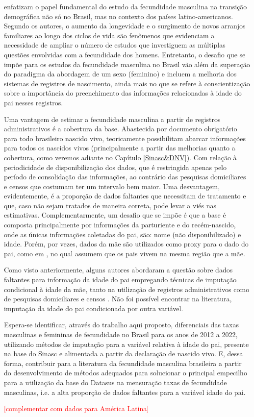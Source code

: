  enfatizam o papel fundamental do estudo da fecundidade masculina na transição demográfica não só no Brasil, mas no contexto dos países latino-americanos. Segundo os autores, o aumento da longevidade e o surgimento de novos arranjos familiares ao longo dos ciclos de vida são fenômenos que evidenciam a necessidade de ampliar o número de estudos que investiguem as múltiplas questões envolvidas com a fecundidade dos homens. Entretanto, o desafio que se impõe para os estudos da fecundidade masculina no Brasil vão além da superação do paradigma da abordagem de um sexo (feminino) e incluem a melhoria dos sistemas de registros de nascimento, ainda mais no que se refere à conscientização sobre a importância do preenchimento das informações relacionadas à idade do pai nesses registros. 
 
Uma vantagem de estimar a fecundidade masculina a partir de registros administrativos é a cobertura da base. Abastecida por documento obrigatório para todo brasileiro nascido vivo, teoricamente possibilitam abarcar informações para todos os nascidos vivos (principalmente a partir das melhorias quanto a cobertura, como veremos adiante no Capítulo  \ref{Sinasc&DNV}). Com relação à periodicidade de disponibilização dos dados, que é restringida apenas pelo período de consolidação das informações, ao contrário das pesquisas domiciliares e censos que costumam ter um intervalo bem maior. Uma desvantagem, evidentemente, é a proporção de dados faltantes que necessitam de tratamento e que, caso não sejam tratados de maneira correta, pode levar a viés nas estimativas. Complementarmente, um desafio que se impõe é que a base é composta principalmente por informações da parturiente e do recém-nascido, onde as únicas informações coletadas do pai, são: nome (não disponibilizado) e idade. Porém, por vezes, dados da mãe são utilizados como proxy para o dado do pai, como em , no qual assumem que os pais vivem na mesma região que a mãe. 

Como visto anteriormente, alguns autores abordaram a questão sobre dados faltantes para informação da idade do pai empregando técnicas de imputação condicional à idade da mãe, tanto na utilização de registros administrativos \cite{dudel2019estimating} como de pesquisas domiciliares \cite{schoumaker2017measuring} e censos \cite{wong2020LatinA}. Não foi possível encontrar na literatura, imputação da idade do pai condicionada por outra variável. 

Espera-se identificar, através do trabalho aqui proposto, diferenciais das taxas masculinas e femininas de fecundidade no Brasil para os anos de 2012 a 2022, utilizando métodos de imputação para a variável relativa à idade do pai, presente na base do Sinasc e alimentada a partir da declaração de nascido vivo. E, dessa forma, contribuir para a literatura da fecundidade masculina brasileira a partir do desenvolvimento de métodos adequados para solucionar o principal empecilho para a utilização da base do Datasus na mensuração taxas de fecundidade masculinas, i.e. a alta proporção de dados faltantes para a variável idade do pai.  

\textcolor{red}{[complementar com dados para América Latina]}